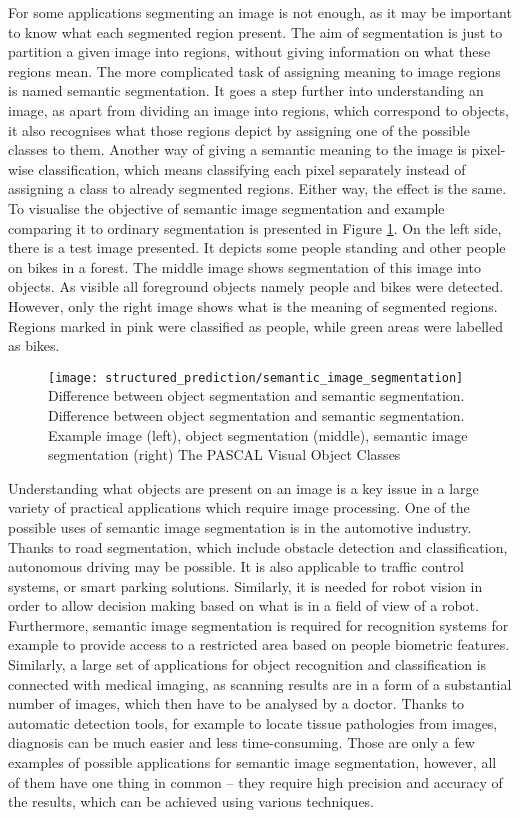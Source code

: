 For some applications segmenting an image is not enough, as it may be important to know what each segmented region present. The aim of segmentation is just to partition a given image into regions, without giving information on what these regions mean. The more complicated task of assigning meaning to image regions is named semantic segmentation. It goes a step further into understanding an image, as apart from dividing an image into regions, which correspond to objects, it also recognises what those regions depict by assigning one of the possible classes to them. Another way of giving a semantic meaning to the image is pixel-wise classification, which means classifying each pixel separately instead of assigning a class to already segmented regions.  Either way, the effect is the same. To visualise the objective of semantic image segmentation and example comparing it to ordinary segmentation is presented in Figure  \ref{fig:semantic_image_segmentation}. 
On the left side, there is a test image presented. It depicts some people standing and other people on bikes in a forest. The middle image shows segmentation of this image into objects. As visible all foreground objects namely people and bikes were detected. However, only the right image shows what is the meaning of segmented regions. Regions marked in pink were classified as people, while green areas were labelled as bikes. 
\begin{figure}[h]
    \texttt{[image: structured\_prediction/semantic\_image\_segmentation]}
    \captionsource
    {Difference between object segmentation and semantic segmentation.}
    {Difference between object segmentation and semantic segmentation. Example image (left), object segmentation (middle), semantic image segmentation (right)}
    {The PASCAL Visual Object Classes \cite{voc}}
     \label{fig:semantic_image_segmentation}
\end{figure}

Understanding what objects are present on an image is a key issue in a large variety of practical applications which require image processing. One of the possible uses of semantic image segmentation is in the automotive industry. Thanks to road segmentation, which include obstacle detection and classification, autonomous driving may be possible. It is also applicable to traffic control systems, or smart parking solutions. Similarly, it is needed for robot vision in order to allow decision making based on what is in a field of view of a robot.  Furthermore, semantic image segmentation is required for recognition systems for example to provide access to a restricted area based on people biometric features. Similarly, a large set of applications for object recognition and classification is connected with medical imaging, as scanning results are in a form of a substantial number of images, which then have to be analysed by a doctor. Thanks to automatic detection tools, for example to locate tissue pathologies from images, diagnosis can be much easier and less time-consuming.  Those are only a few examples of possible applications for semantic image segmentation, however, all of them have one thing in common – they require high precision and accuracy of the results, which can be achieved using various techniques. 
 
